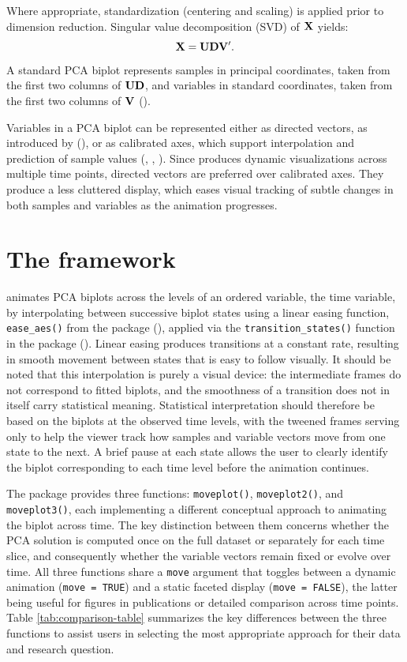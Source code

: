 Where appropriate, standardization (centering and scaling) is applied prior to dimension reduction. Singular value decomposition (SVD) of \({\bf{X}}\) yields:
\[{\bf{X=UDV'}}.\]
A standard PCA biplot represents samples in principal coordinates, taken from the first two columns of \({\bf{UD}}\), and variables in standard coordinates, taken from the first two columns of \({\bf{V}}\) (\citet{Greenacre2022PCA}).

Variables in a PCA biplot can be represented either as directed vectors, as introduced by (\citet{Gabriel}), or as calibrated axes, which support interpolation and prediction of sample values (\citet{Blasius}, \citet{Biplots}, \citet{UB}). Since  produces dynamic visualizations across multiple time points, directed vectors are preferred over calibrated axes. They produce a less cluttered display, which eases visual tracking of subtle changes in both samples and variables as the animation progresses.

\section{\texorpdfstring{The  framework}{The  framework}}\label{the-framework}

 animates PCA biplots across the levels of an ordered variable, the time variable, by interpolating between successive biplot states using a linear easing function, \texttt{ease\_aes()} from the  package (\citet{tweenr}), applied via the \texttt{transition\_states()} function in the package  (\citet{gganimate}). Linear easing produces transitions at a constant rate, resulting in smooth movement between states that is easy to follow visually. It should be noted that this interpolation is purely a visual device: the intermediate frames do not correspond to fitted biplots, and the smoothness of a transition does not in itself carry statistical meaning. Statistical interpretation should therefore be based on the biplots at the observed time levels, with the tweened frames serving only to help the viewer track how samples and variable vectors move from one state to the next. A brief pause at each state allows the user to clearly identify the biplot corresponding to each time level before the animation continues.

The package provides three functions: \texttt{moveplot()}, \texttt{moveplot2()}, and \texttt{moveplot3()}, each implementing a different conceptual approach to animating the biplot across time. The key distinction between them concerns whether the PCA solution is computed once on the full dataset or separately for each time slice, and consequently whether the variable vectors remain fixed or evolve over time. All three functions share a \texttt{move} argument that toggles between a dynamic animation (\texttt{move\ =\ TRUE}) and a static faceted display (\texttt{move\ =\ FALSE}), the latter being useful for figures in publications or detailed comparison across time points. Table
\ref{tab:comparison-table} summarizes the key differences between the three functions to assist users in selecting the most appropriate approach for their data and research question.


